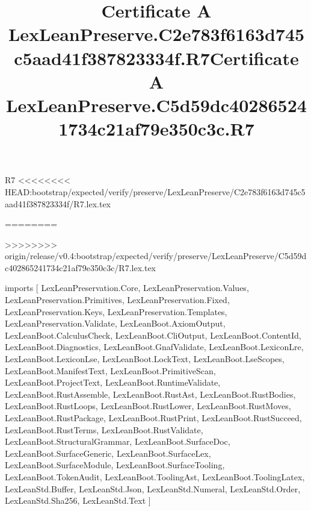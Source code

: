 \begin{lexlean}{R7}
<<<<<<<< HEAD:bootstrap/expected/verify/preserve/LexLeanPreserve/C2e783f6163d745c5aad41f387823334f/R7.lex.tex
\title{Certificate A LexLeanPreserve.C2e783f6163d745c5aad41f387823334f.R7}
========
\title{Certificate A LexLeanPreserve.C5d59dc402865241734c21af79e350c3c.R7}
>>>>>>>> origin/release/v0.4:bootstrap/expected/verify/preserve/LexLeanPreserve/C5d59dc402865241734c21af79e350c3c/R7.lex.tex
\begin{coremodule}
imports [
  LexLeanPreservation.Core,
  LexLeanPreservation.Values,
  LexLeanPreservation.Primitives,
  LexLeanPreservation.Fixed,
  LexLeanPreservation.Keys,
  LexLeanPreservation.Templates,
  LexLeanPreservation.Validate,
  LexLeanBoot.AxiomOutput,
  LexLeanBoot.CalculusCheck,
  LexLeanBoot.CliOutput,
  LexLeanBoot.ContentId,
  LexLeanBoot.Diagnostics,
  LexLeanBoot.GnafValidate,
  LexLeanBoot.LexiconLre,
  LexLeanBoot.LexiconLse,
  LexLeanBoot.LockText,
  LexLeanBoot.LseScopes,
  LexLeanBoot.ManifestText,
  LexLeanBoot.PrimitiveScan,
  LexLeanBoot.ProjectText,
  LexLeanBoot.RuntimeValidate,
  LexLeanBoot.RustAssemble,
  LexLeanBoot.RustAst,
  LexLeanBoot.RustBodies,
  LexLeanBoot.RustLoops,
  LexLeanBoot.RustLower,
  LexLeanBoot.RustMoves,
  LexLeanBoot.RustPackage,
  LexLeanBoot.RustPrint,
  LexLeanBoot.RustSucceed,
  LexLeanBoot.RustTerms,
  LexLeanBoot.RustValidate,
  LexLeanBoot.StructuralGrammar,
  LexLeanBoot.SurfaceDoc,
  LexLeanBoot.SurfaceGeneric,
  LexLeanBoot.SurfaceLex,
  LexLeanBoot.SurfaceModule,
  LexLeanBoot.SurfaceTooling,
  LexLeanBoot.TokenAudit,
  LexLeanBoot.ToolingAst,
  LexLeanBoot.ToolingLatex,
  LexLeanStd.Buffer,
  LexLeanStd.Json,
  LexLeanStd.Numeral,
  LexLeanStd.Order,
  LexLeanStd.Sha256,
  LexLeanStd.Text
]


\end{coremodule}
\end{lexlean}
